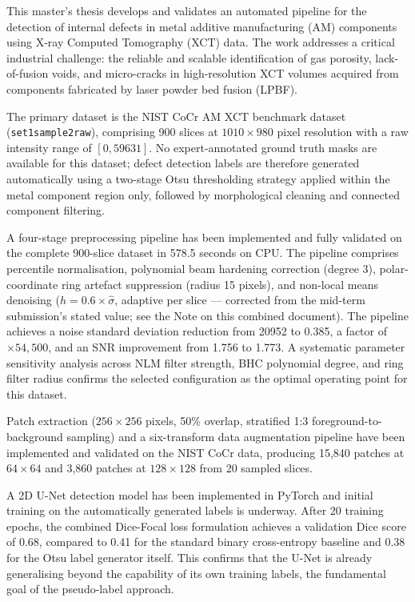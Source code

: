 \clearpage
{}
This master's thesis develops and validates an automated pipeline for the detection of internal
defects in metal additive manufacturing (AM) components using X-ray Computed Tomography (XCT) data.
The work addresses a critical industrial challenge: the reliable and scalable identification of gas
porosity, lack-of-fusion voids, and micro-cracks in high-resolution XCT volumes acquired from
components fabricated by laser powder bed fusion (LPBF).

The primary dataset is the NIST CoCr AM XCT benchmark dataset (\texttt{set1sample2raw}), comprising
900 slices at $1010 \times 980$ pixel resolution with a raw intensity range of $[0, 59631]$. No
expert-annotated ground truth masks are available for this dataset; defect detection labels are
therefore generated automatically using a two-stage Otsu thresholding strategy applied within the
metal component region only, followed by morphological cleaning and connected component filtering.

A four-stage preprocessing pipeline has been implemented and fully validated on the complete
900-slice dataset in 578.5 seconds on CPU. The pipeline comprises percentile normalisation,
polynomial beam hardening correction (degree 3), polar-coordinate ring artefact suppression (radius
15 pixels), and non-local means denoising ($h = 0.6 \times \hat{\sigma}$, adaptive per slice ---
corrected from the mid-term submission's stated value; see the Note on this combined document). The
pipeline achieves a noise standard deviation reduction from 20952 to 0.385, a factor of
$\times 54{,}500$, and an SNR improvement from 1.756 to 1.773. A systematic parameter sensitivity
analysis across NLM filter strength, BHC polynomial degree, and ring filter radius confirms the
selected configuration as the optimal operating point for this dataset.

Patch extraction ($256 \times 256$ pixels, 50\% overlap, stratified 1:3 foreground-to-background
sampling) and a six-transform data augmentation pipeline have been implemented and validated on the
NIST CoCr data, producing 15,840 patches at $64 \times 64$ and 3,860 patches at $128 \times 128$ from
20 sampled slices.

A 2D U-Net detection model has been implemented in PyTorch and initial training on the automatically
generated labels is underway. After 20 training epochs, the combined Dice-Focal loss formulation
achieves a validation Dice score of 0.68, compared to 0.41 for the standard binary cross-entropy
baseline and 0.38 for the Otsu label generator itself. This confirms that the U-Net is already
generalising beyond the capability of its own training labels, the fundamental goal of the
pseudo-label approach.

